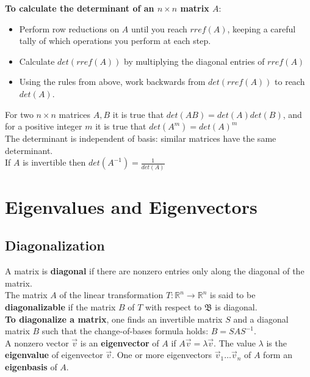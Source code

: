 \documentclass[]{scrartcl}
\begin{document}
	\textbf{To calculate the determinant of an $n \times n$ matrix $A$}:
	\begin{itemize}
		\item Perform row reductions on $A$ until you reach $rref(A)$, keeping a careful tally of which operations you perform at each step.
		\item Calculate $det(rref(A))$ by multiplying the diagonal entries of $rref(A)$
		\item Using the rules from above, work backwards from $det(rref(A))$ to reach $det(A)$.
	\end{itemize}
	
	For two $n \times n$ matrices $A, B$ it is true that $det(AB) = det(A) det(B)$, and for a positive integer $m$ it is true that $det(A^m) = det(A)^m$\\
	
	The determinant is independent of basis: similar matrices have the same determinant.\\
	
	If $A$ is invertible then $det(A^{-1}) = \frac{1}{det(A)}$

	\setcounter{section}{6}
	\section{Eigenvalues and Eigenvectors}
	\subsection{Diagonalization}
	A matrix is \textbf{diagonal} if there are nonzero entries only along the diagonal of the matrix.\\
	
	The matrix $A$ of the linear transformation $T: \mathbb{R}^n \rightarrow \mathbb{R}^n$ is said to be \textbf{diagonalizable} if the matrix $B$ of $T$ with respect to $\mathfrak{B}$ is diagonal.\\
	
	\textbf{To diagonalize a matrix}, one finds an invertible matrix $S$ and a diagonal matrix $B$ such that the change-of-bases formula holds: $B = SAS^{-1}$.\\
	
	A nonzero vector $\vec{v}$ is an \textbf{eigenvector} of $A$ if $A\vec{v} = \lambda \vec{v}$. The value $\lambda$ is the \textbf{eigenvalue} of eigenvector $\vec{v}$. One or more eigenvectors $\vec{v}_1 \ldots \vec{v}_n$ of $A$ form an \textbf{eigenbasis} of $A$.\\
	
\end{document}
